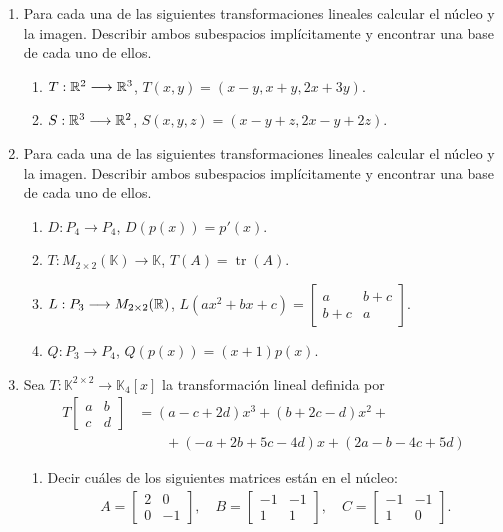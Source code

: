 \begin{enumerate}[topsep=6pt, itemsep=.4cm]
\item \label{lineales1} Para cada una de las siguientes transformaciones lineales calcular el núcleo y la imagen. Describir ambos subespacios implícitamente y encontrar una base de cada uno de ellos.    
    \begin{enumerate}
        \item\label{lineales1-a} $T:\mathbb R^2 \longrightarrow \mathbb R^3$, $T(x,y)=(x-y,x+y,2x+3y)$.
        \item\label{lineales1-b} $S:\mathbb R^3 \longrightarrow \mathbb R^2$, $S(x,y,z)=(x-y+z,2x-y+2z)$.
    \end{enumerate}

\item \label{lineales2} Para cada una de las siguientes transformaciones lineales calcular el núcleo y la imagen. Describir ambos subespacios implícitamente y encontrar una base de cada uno de ellos.    
    \begin{enumerate}
        \item $D:P_4  \longrightarrow P_4$, $D(p(x))=p'(x)$.
        \item $T:M_{2\times 2}(\mathbb{K}) \longrightarrow \mathbb{K}$, $T(A)=\operatorname{tr}(A)$.
        \item $L:P_3 \longrightarrow M_{2\times 2}(\mathbb R)$, $L(ax^2+bx+c)=\begin{bmatrix} a & b+c \\ b+c & a \end{bmatrix}$.
        \item $Q:P_3 \longrightarrow P_4$, $Q(p(x))=(x+1)p(x)$.
    \end{enumerate}

\item Sea $T:\mathbb{K}^{2\times 2}\longrightarrow\mathbb{K}_{4}[x]$ la transformación lineal definida por
    \begin{align*}
    T   \begin{bmatrix}  a&b\\c&d \end{bmatrix} &= (a-c+2d)x^3+(b+2c-d)x^2+ \\
    &\qquad+(-a+2b+5c-4d)x+(2a-b-4c+5d)
    \end{align*}
    \begin{enumerate}
        \item Decir cuáles de los siguientes matrices están en el núcleo:
            \begin{align*}
                A=\begin{bmatrix}
                    2&0\\0&-1
                \end{bmatrix},
            \quad
            B=\begin{bmatrix}
                -1&-1\\1&1
            \end{bmatrix},
            \quad
            C=\begin{bmatrix}
                -1&-1\\1&0
            \end{bmatrix}.
            \end{align*}


\end{enumerate}
\end{enumerate}
